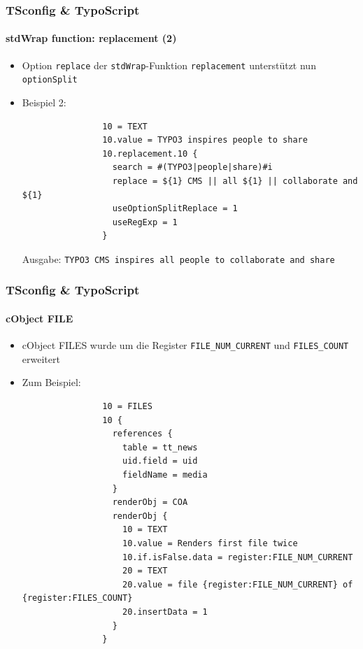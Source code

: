 
\begin{frame}[fragile]
	\frametitle{TSconfig \& TypoScript}
	\framesubtitle{stdWrap function: replacement (2)}

	\begin{itemize}
		\item Option \texttt{replace} der \texttt{stdWrap}-Funktion \texttt{replacement}\newline
			unterstützt nun \texttt{optionSplit}

		\item Beispiel 2:

			\begin{lstlisting}
				10 = TEXT
				10.value = TYPO3 inspires people to share
				10.replacement.10 {
				  search = #(TYPO3|people|share)#i
				  replace = ${1} CMS || all ${1} || collaborate and ${1}
				  useOptionSplitReplace = 1
				  useRegExp = 1
				}
			\end{lstlisting}

			Ausgabe:\newline
				\texttt{TYPO3 CMS inspires all people to collaborate and share}

	\end{itemize}

\end{frame}


\begin{frame}[fragile]
	\frametitle{TSconfig \& TypoScript}
	\framesubtitle{cObject FILE}

	\begin{itemize}
		\item cObject FILES wurde um die Register \texttt{FILE\_NUM\_CURRENT} und \texttt{FILES\_COUNT} erweitert

		\item Zum Beispiel:

			\lstset{
				basicstyle=\tiny\ttfamily
			}

			\begin{lstlisting}
				10 = FILES
				10 {
				  references {
				    table = tt_news
				    uid.field = uid
				    fieldName = media
				  }
				  renderObj = COA
				  renderObj {
				    10 = TEXT
				    10.value = Renders first file twice
				    10.if.isFalse.data = register:FILE_NUM_CURRENT
				    20 = TEXT
				    20.value = file {register:FILE_NUM_CURRENT} of {register:FILES_COUNT}
				    20.insertData = 1
				  }
				}
			\end{lstlisting}

	\end{itemize}

\end{frame}

